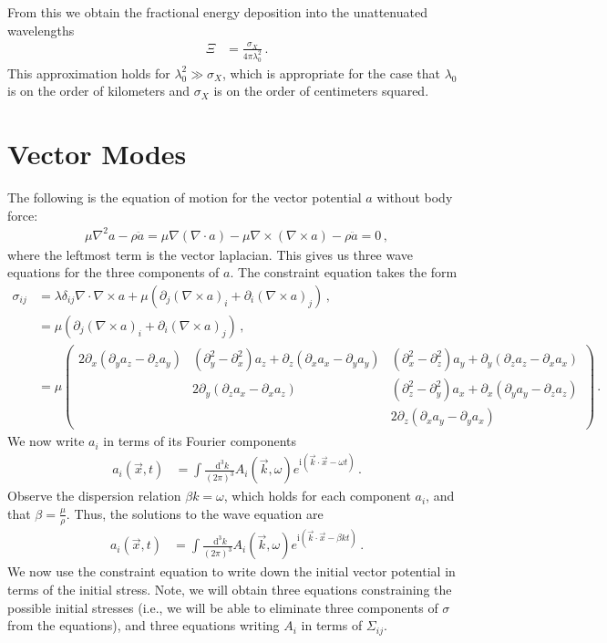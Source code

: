 \documentclass{article}
\newcommand*\diff{\mathop{}\!\mathrm{d}}
\newcommand*\te[1]{\text{#1}}
\newcommand*\f[2]{\frac{#1}{#2}}
\newcommand*\mat[2]{\left(\begin{array}{#1}#2\end{array}\right)}
\newcommand*\I{\te{i}}
\begin{document}
From this we obtain the fractional energy deposition into the unattenuated wavelengths
\begin{align}
\Xi&=\f{\sigma_X}{4\pi\lambda_0^2}\,.
\end{align}
This approximation holds for $\lambda_0^2\gg\sigma_X$, which is appropriate for the case that $\lambda_0$ is on the order of kilometers and $\sigma_X$ is on the order of centimeters squared.
\pagebreak
\section{Vector Modes}
The following is the equation of motion for the vector potential $a$ without body force:
\begin{align}
\mu\nabla^2a-\rho\ddot a=\mu\nabla(\nabla\cdot a)-\mu\nabla\times(\nabla\times a)-\rho\ddot a=0\,,
\end{align}
where the leftmost term is the vector laplacian. This gives us three wave equations for the three components of $a$. The constraint equation takes the form
\begin{align}
\sigma_{ij}&=\lambda\delta_{ij}\nabla\cdot \nabla\times a+\mu(\partial_j (\nabla\times a)_i+\partial_i (\nabla\times a)_j)\,,\\
&=\mu(\partial_j (\nabla\times a)_i+\partial_i (\nabla\times a)_j)\,,\\
&=\mu\mat{ccc}{2\partial_x(\partial_ya_z-\partial_za_y)&(\partial_y^2-\partial_x^2)a_z+\partial_z(\partial_x a_x-\partial_y a_y)&(\partial_x^2-\partial_z^2)a_y+\partial_y(\partial_z a_z-\partial_x a_x)\\
&2\partial_y(\partial_z a_x-\partial_x a_z)&(\partial_z^2-\partial_y^2)a_x+\partial_x(\partial_ya_y-\partial_za_z)\\
&&2\partial_z(\partial_xa_y-\partial_ya_x)}\,.
\end{align}
We now write $a_i$ in terms of its Fourier components
\begin{align}
a_i(\vec x,t)&=\int\f{\diff^3k}{(2\pi)^3}A_i(\vec k,\omega)e^{\I(\vec k\cdot\vec x-\omega t)}\,.
\end{align}
Observe the dispersion relation $\beta k=\omega$, which holds for each component $a_i$, and that $\beta=\f\mu\rho$. Thus, the solutions to the wave equation are
\begin{align}
a_i(\vec x,t)&=\int\f{\diff^3k}{(2\pi)^3}A_i(\vec k,\omega)e^{\I(\vec k\cdot\vec x-\beta k t)}\,.
\end{align}
We now use the constraint equation to write down the initial vector potential in terms of the initial stress. Note, we will obtain three equations constraining the possible initial stresses (i.e., we will be able to eliminate three components of $\sigma$ from the equations), and three equations writing $A_i$ in terms of $\Sigma_{ij}$.
\end{document}
